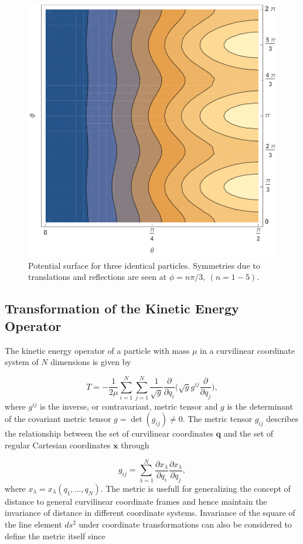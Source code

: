 \begin{figure}[!b]
	\centering
	\includegraphics[width=0.60\linewidth]{potential.pdf}
	\caption{Potential surface for three identical particles. Symmetries due to translations and reflections are seen at $\phi = n\pi/3, \ (n = 1-5)$.}
	\label{fig:potential}
\end{figure}

\subsection{Transformation of the Kinetic Energy Operator}\label{Appendix_2_2}
The kinetic energy operator of a particle with mass $\mu$ in a curvilinear coordinate system of $N$ dimensions is given by \cite{podolsky_1928}

\begin{equation}\label{eq:kinetic_e_op}
T = -\frac{1}{2\mu} \sum_{i=1}^{N} \sum_{j=1}^{N} \frac{1}{\sqrt{g}} \frac{\partial}{\partial q_i} \bigg(\sqrt{g} g^{ij} \frac{\partial}{\partial q_j}\bigg),
\end{equation}
where $g^{ij}$ is the inverse, or contravariant, metric tensor and $g$ is the determinant of the covariant metric tensor $g = \det(g_{ij}) \neq 0$. The metric tensor $g_{ij}$ describes the relationship between the set of curvilinear coordinates $\mathbf{q}$ and the set of regular Cartesian coordinates $\mathbf{x}$ through

\begin{equation}
g_{ij} = \sum_{\lambda = 1}^{N} \frac{\partial x_{\lambda}}{\partial q_{i}} \frac{\partial x_{\lambda}}{\partial q_{j}},
\end{equation}
where $x_{\lambda} = x_{\lambda}(q_1,\ldots,q_N)$. The metric is usefull for generalizing the concept of distance to general curvilinear coordinate frames and hence maintain the invariance of distance in different coordinate systems. Invariance of the square of the line element $d s^2$ under coordinate transformations can also be considered to define the metric itself since

